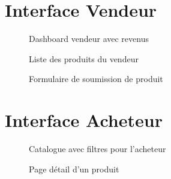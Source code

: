 \documentclass[12pt,a4paper]{report}
\begin{document}
\section{Interface Vendeur}

\begin{figure}[H]
    \centering
    \caption{Dashboard vendeur avec revenus}
    \label{fig:seller_dashboard}
\end{figure}

\begin{figure}[H]
    \centering
    \caption{Liste des produits du vendeur}
    \label{fig:seller_products}
\end{figure}

\begin{figure}[H]
    \centering
    \caption{Formulaire de soumission de produit}
    \label{fig:seller_product_form}
\end{figure}

\section{Interface Acheteur}

\begin{figure}[H]
    \centering
    \caption{Catalogue avec filtres pour l'acheteur}
    \label{fig:buyer_shop}
\end{figure}

\begin{figure}[H]
    \centering
    \caption{Page détail d'un produit}
    \label{fig:product_detail}
\end{figure}
\end{document}
